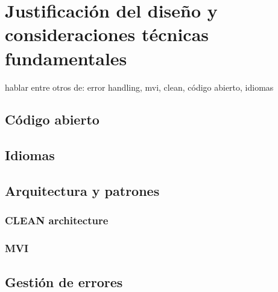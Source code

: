 \chapter{Justificación del diseño y consideraciones técnicas fundamentales}
\label{cap:JustificacionYConsideraciones}
hablar entre otros de: error handling, mvi, clean, código abierto, idiomas
\section{Código abierto}
\section{Idiomas}
\section{Arquitectura y patrones}
\subsection{CLEAN architecture}
\subsection{MVI}
\section{Gestión de errores}